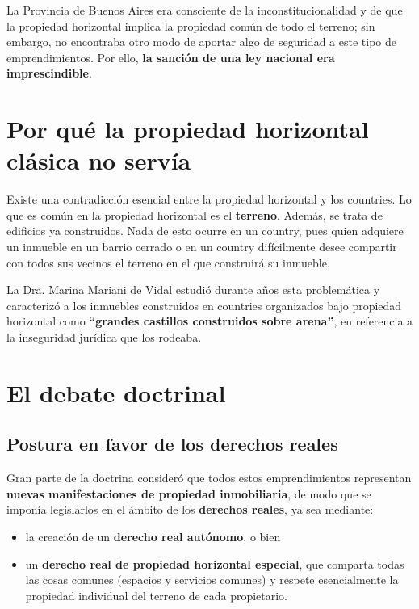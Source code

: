 \documentclass[12pt,oneside]{book}
\begin{document}
La Provincia de Buenos Aires era consciente de la inconstitucionalidad y de que la propiedad horizontal implica la propiedad común de todo el terreno; sin embargo, no encontraba otro modo de aportar algo de seguridad a este tipo de emprendimientos. Por ello, \textbf{la sanción de una ley nacional era imprescindible}.

\section{Por qué la propiedad horizontal clásica no servía}

Existe una contradicción esencial entre la propiedad horizontal y los countries. Lo que es común en la propiedad horizontal es el \textbf{terreno}. Además, se trata de edificios ya construidos. Nada de esto ocurre en un country, pues quien adquiere un inmueble en un barrio cerrado o en un country difícilmente desee compartir con todos sus vecinos el terreno en el que construirá su inmueble.

\begin{note}
La Dra. Marina Mariani de Vidal estudió durante años esta problemática y caracterizó a los inmuebles construidos en countries organizados bajo propiedad horizontal como \textbf{``grandes castillos construidos sobre arena''}, en referencia a la inseguridad jurídica que los rodeaba.
\end{note}

\section{El debate doctrinal}

\subsection{Postura en favor de los derechos reales}

Gran parte de la doctrina consideró que todos estos emprendimientos representan \textbf{nuevas manifestaciones de propiedad inmobiliaria}, de modo que se imponía legislarlos en el ámbito de los \textbf{derechos reales}, ya sea mediante:

\begin{itemize}
    \item la creación de un \textbf{derecho real autónomo}, o bien
    \item un \textbf{derecho real de propiedad horizontal especial}, que comparta todas las cosas comunes (espacios y servicios comunes) y respete esencialmente la propiedad individual del terreno de cada propietario.
\end{itemize}
\end{document}
